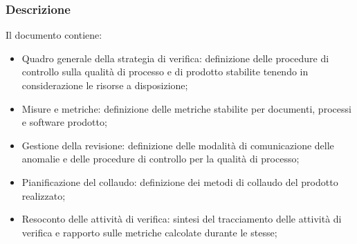 \documentclass[../NomeDocumento.tex]{subfiles}
\begin{document}
\subsubsection{Descrizione}
Il documento contiene:

\begin{itemize}
    \item{Quadro generale della strategia di verifica:} definizione delle procedure di controllo sulla qualità di processo e di prodotto stabilite tenendo in considerazione le risorse a disposizione;
    
    \item{Misure e metriche:} definizione delle metriche stabilite per documenti, processi e software prodotto;
    
    \item{Gestione della revisione:} definizione delle modalità di comunicazione delle anomalie e delle procedure di controllo per la qualità di processo;
    
    \item{Pianificazione del collaudo:} definizione dei metodi di collaudo del prodotto realizzato;
    
    \item{Resoconto delle attività di verifica:} sintesi del tracciamento delle attività di verifica e rapporto sulle metriche calcolate durante le stesse;
\end{itemize}
\end{document}

